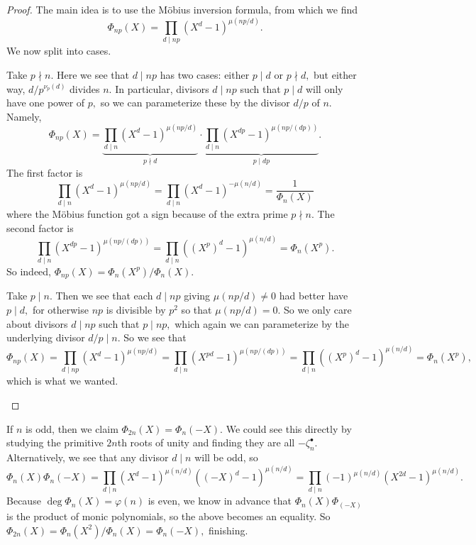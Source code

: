 \documentclass[../notes.tex]{subfiles}
\begin{document}
\begin{proof}
	The main idea is to use the M\"obius inversion formula, from which we find
	\[\Phi_{np}(X)=\prod_{d\mid np}\left(X^d-1\right)^{\mu(np/d)}.\]
	We now split into cases.
	\begin{listalph}
		\item Take $p\nmid n.$ Here we see that $d\mid np$ has two cases: either $p\mid d$ or $p\nmid d,$ but either way, $d/p^{\nu_p(d)}$ divides $n.$ In particular, divisors $d\mid np$ such that $p\mid d$ will only have one power of $p,$ so we can parameterize these by the divisor $d/p$ of $n.$ Namely,
		\[\Phi_{np}(X)=\underbrace{\prod_{d\mid n}\left(X^d-1\right)^{\mu(np/d)}}_{p\nmid d}\cdot\underbrace{\prod_{d\mid n}\left(X^{dp}-1\right)^{\mu(np/(dp))}}_{p\mid dp}.\]
		The first factor is
		\[\prod_{d\mid n}\left(X^d-1\right)^{\mu(np/d)}=\prod_{d\mid n}\left(X^d-1\right)^{-\mu(n/d)}=\frac1{\Phi_n(X)}\]
		where the M\"obius function got a sign because of the extra prime $p\nmid n.$ The second factor is
		\[\prod_{d\mid n}\left(X^{dp}-1\right)^{\mu(np/(dp))}=\prod_{d\mid n}\left(\left(X^p\right)^d-1\right)^{\mu(n/d)}=\Phi_n\left(X^p\right).\]
		So indeed, $\Phi_{np}(X)=\Phi_n\left(X^p\right)/\Phi_n(X).$
		\item Take $p\mid n.$ Then we see that each $d\mid np$ giving $\mu(np/d)\ne0$ had better have $p\mid d,$ for otherwise $np$ is divisible by $p^2$ so that $\mu(np/d)=0.$ So we only care about divisors $d\mid np$ such that $p\mid np,$ which again we can parameterize by the underlying divisor $d/p\mid n.$ So we see that
		\[\Phi_{np}(X)=\prod_{d\mid np}\left(X^d-1\right)^{\mu(np/d)}=\prod_{d\mid n}\left(X^{pd}-1\right)^{\mu(np/(dp))}=\prod_{d\mid n}\left(\left(X^p\right)^d-1\right)^{\mu(n/d)}=\Phi_n\left(X^p\right),\]
		which is what we wanted.
		\qedhere
	\end{listalph}
\end{proof}
\begin{example}
	If $n$ is odd, then we claim $\Phi_{2n}(X)=\Phi_n(-X).$ We could see this directly by studying the primitive $2n$th roots of unity and finding they are all $-\zeta_n^\bullet.$ Alternatively, we see that any divisor $d\mid n$ will be odd, so
	\[\Phi_n(X)\Phi_n(-X)=\prod_{d\mid n}\left(X^d-1\right)^{\mu(n/d)}\left((-X)^d-1\right)^{\mu(n/d)}=\prod_{d\mid n}(-1)^{\mu(n/d)}\left(X^{2d}-1\right)^{\mu(n/d)}.\]
	Because $\deg\Phi_n(X)=\varphi(n)$ is even, we know in advance that $\Phi_n(X)\Phi_(-X)$ is the product of monic polynomials, so the above becomes an equality. So $\Phi_{2n}(X)=\Phi_n\left(X^2\right)/\Phi_n(X)=\Phi_n(-X),$ finishing.
\end{example}
\end{document}
